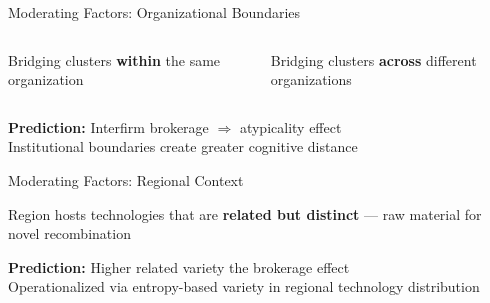 \begin{frame}{Moderating Factors: Organizational Boundaries}

\begin{columns}[T,onlytextwidth]
\begin{softbox}[title=Intrafirm brokerage]
Bridging clusters \textbf{within} the same organization
\end{softbox}

\begin{softbox}[title=Interfirm brokerage]
Bridging clusters \textbf{across} different organizations
\end{softbox}
\end{columns}

\vspace{0.25cm}
\begin{eqbox}
\textbf{Prediction:} Interfirm brokerage $\Rightarrow$  atypicality effect\\[3pt]
Institutional boundaries create greater cognitive distance
\end{eqbox}
\end{frame}

\begin{frame}{Moderating Factors: Regional Context}

\begin{softbox}[title=Related variety]
Region hosts technologies that are \textbf{related but distinct} --- raw material for novel recombination
\end{softbox}

\vspace{0.25cm}
\begin{eqbox}
\textbf{Prediction:} Higher related variety  the brokerage effect\\[3pt]
Operationalized via entropy-based variety in regional technology distribution
\end{eqbox}
\end{frame}
